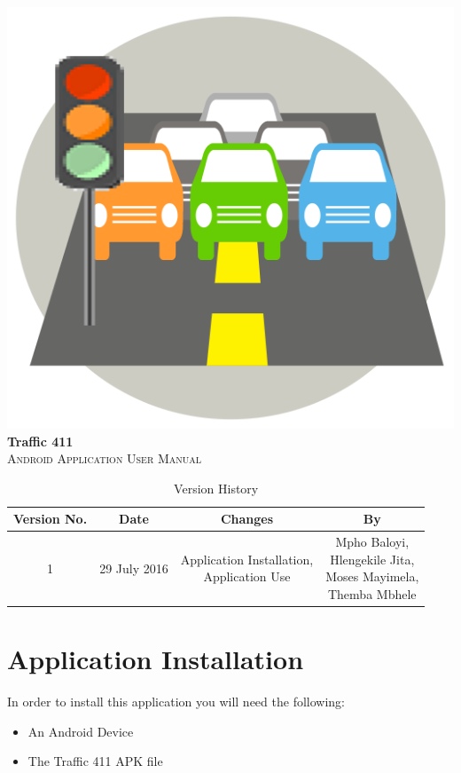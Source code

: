 \documentclass[a4paper,12pt]{article}
\begin{document}
\newpage
\tableofcontents
\newpage
\includegraphics[width=\textwidth]{images/coverPage.png}
\textbf{Traffic 411}\\
\textsc{\large Android Application User Manual}\\[0.5cm]
\newpage
\tableofcontents
\newpage

\newpage
\begin{table}[ht]
 \centering
 \caption{Version History}
 \label{tab:table1}
 \begin{tabular}{cccc}
   \toprule
    Version No. & Date & Changes & By\\
    \midrule
    1 & 29 July 2016 & \makecell{Application Installation, \\ Application Use} & \makecell{Mpho Baloyi,\\ Hlengekile Jita,\\ Moses Mayimela,\\ Themba Mbhele} \\
    \bottomrule
  \end{tabular}
\end{table}
\newpage

\section{Application Installation}
In order to install this application you will need the following:
\begin{itemize}
\item An Android Device
\item The Traffic 411 APK file
\end{itemize}
\end{document}
